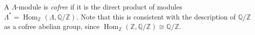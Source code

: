 A $\Lambda$-module is \textit{cofree} if it is the direct product of modules $\Lambda^* = \operatorname{Hom}_{\mathbb{Z}}(\Lambda, \mathbb{Q}/\mathbb{Z})$. Note that this is consistent with the description of $\mathbb{Q}/\mathbb{Z}$ as a cofree abelian group, since $\operatorname{Hom}_{\mathbb{Z}}(\mathbb{Z}, \mathbb{Q}/\mathbb{Z}) \cong \mathbb{Q}/\mathbb{Z}$.
